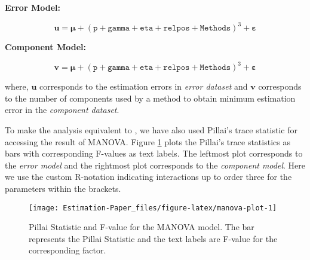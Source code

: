 \documentclass[12pt,3p,authoryear]{elsarticle}
\begin{document}
\textbf{Error Model:}

\begin{equation}
  \mathbf{u} = \boldsymbol{\mu} +
  (\texttt{p} + \texttt{gamma} + \texttt{eta} +
    \texttt{relpos} + \texttt{Methods})^3 +
    \boldsymbol{\varepsilon}
  \label{eq:err-model}
\end{equation}

\textbf{Component Model:}

\begin{equation}
  \mathbf{v} = \boldsymbol{\mu} +
  (\texttt{p} + \texttt{gamma} + \texttt{eta} +
    \texttt{relpos} + \texttt{Methods})^3 +
    \boldsymbol{\varepsilon}
  \label{eq:comp-model}
\end{equation}

where, \(\mathbf{u}\) corresponds to the estimation errors in
\emph{error dataset} and \(\mathbf{v}\) corresponds to the number of
components used by a method to obtain minimum estimation error in the
\emph{component dataset}.

To make the analysis equivalent to \citet{rimal2019pred}, we have also
used Pillai's trace statistic for accessing the result of MANOVA. Figure
\ref{fig:manova-plot} plots the Pillai's trace statistics as bars with
corresponding F-values as text labels. The leftmost plot corresponds to
the \emph{error model} and the rightmost plot corresponds to the
\emph{component model}. Here we use the custom R-notation indicating
interactions up to order three for the parameters within the brackets.





\begin{figure}[H]
\texttt{[image: Estimation-Paper\_files/figure-latex/manova-plot-1]} \caption{Pillai Statistic and F-value for the MANOVA model. The
bar represents the Pillai Statistic and the text labels are F-value for
the corresponding factor.}\label{fig:manova-plot}
\end{figure}
\end{document}
